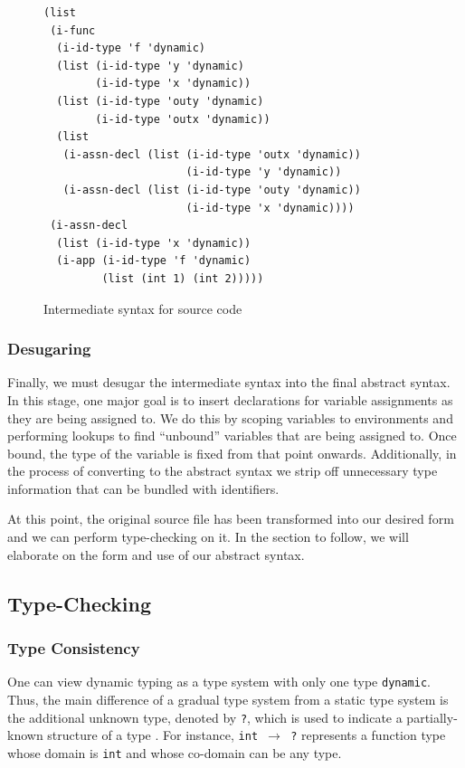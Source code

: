 \begin{figure}[h]
    \begin{lstlisting}[language=racket]
(list
 (i-func
  (i-id-type 'f 'dynamic)
  (list (i-id-type 'y 'dynamic)
        (i-id-type 'x 'dynamic))
  (list (i-id-type 'outy 'dynamic)
        (i-id-type 'outx 'dynamic))
  (list
   (i-assn-decl (list (i-id-type 'outx 'dynamic))
                      (i-id-type 'y 'dynamic))
   (i-assn-decl (list (i-id-type 'outy 'dynamic))
                      (i-id-type 'x 'dynamic))))
 (i-assn-decl
  (list (i-id-type 'x 'dynamic))
  (i-app (i-id-type 'f 'dynamic)
         (list (int 1) (int 2)))))
    \end{lstlisting}
    \caption[]{Intermediate syntax for source code}
    \label{fig:intermediate}
\end{figure}

\subsubsection{Desugaring}
Finally, we must desugar the intermediate syntax into the final abstract syntax. In this stage, one major goal is to insert declarations for variable assignments as they are being assigned to. We do this by scoping variables to environments and performing lookups to find ``unbound'' variables that are being assigned to. Once bound, the type of the variable is fixed from that point onwards. Additionally, in the process of converting to the abstract syntax we strip off unnecessary type information that can be bundled with identifiers.

At this point, the original source file has been transformed into our desired form and we can perform type-checking on it. In the section to follow, we will elaborate on the form and use of our abstract syntax.

\subsection{Type-Checking}

\subsubsection{Type Consistency}
\label{sec:consistency}
One can view dynamic typing as a type system with only one type {\tt dynamic}. Thus, the main difference of a gradual type system from a static type system is the additional unknown type, denoted by {\tt ?}, which is used to indicate a partially-known structure of a type \cite{siek2006gradual}. For instance, {\tt int $\to$ ?} represents a function type whose domain is {\tt int} and whose co-domain can be any type.

